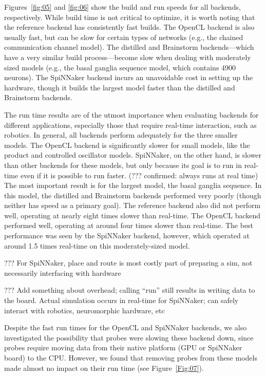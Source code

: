 \documentclass{frontiersSCNS}
\begin{document}
Figures~\ref{fig:05} and \ref{fig:06} show
the build and run speeds for all backends, respectively.
While build time is not critical to optimize,
it is worth noting that the reference backend
has consistently fast builds.
The OpenCL backend is also usually fast,
but can be slow for certain types of networks
(e.g., the chained communication channel model).
The distilled and Brainstorm backends---which
have a very similar build process---become
slow when dealing with moderately sized models
(e.g., the basal ganglia sequence model,
which contains 4900 neurons).
The SpiNNaker backend incurs an unavoidable cost
in setting up the hardware,
though it builds the largest model faster than
the distilled and Brainstorm backends.

The run time results are of the utmost importance
when evaluating backends for different applications,
especially those that require real-time interaction,
such as robotics. In general, all backends
perform adequately for the three smaller models.
The OpenCL backend is significantly slower for small
models, like the product and controlled oscillator models.
SpiNNaker, on the other hand, is slower than other backends
for these models, but only because its goal
is to run in real-time even if it is possible to run faster.
(??? confirmed: always runs at real time)
The most important result is for the largest model,
the basal ganglia sequence.
In this model, the distilled and Brainstorm backends
performed very poorly
(though neither has speed as a primary goal).
The reference backend also did not perform well,
operating at nearly eight times slower than real-time.
The OpenCL backend performed well, operating at around
four times slower than real-time.
The best performance was seen by the SpiNNaker backend,
however, which operated at around 1.5 times real-time
on this moderately-sized model.

??? For SpiNNaker, place and route is most costly part of
preparing a sim, not necessarily interfacing with hardware

??? Add something about overhead; calling ``run'' still
results in writing data to the board. Actual simulation
occurs in real-time for SpiNNaker; can safely interact
with robotics, neuromorphic hardware, etc

Despite the fast run times for
the OpenCL and SpiNNaker backends,
we also investigated the possibility
that probes were slowing these backend down,
since probes require moving data from
their native platform (GPU or SpiNNaker board)
to the CPU. However, we found that
removing probes from these models
made almost no impact on their run time
(see Figure~\ref{Fig:07}).
\end{document}

